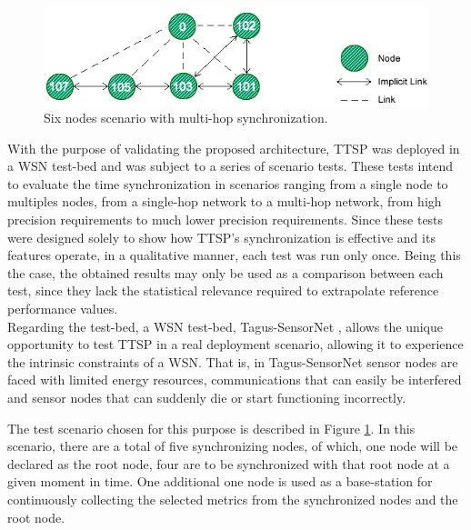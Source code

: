 \documentclass[11pt,a4]{article}
\begin{document}
\begin{multicols}{2}
\begin{figure}[!b]
\begin{center}
\includegraphics[scale=0.4]{./images/19-ttsp-test_topology.png}
\end{center}
\caption{Six nodes scenario with multi-hop synchronization.}
\label{scenario6}
\end{figure}

With the purpose of validating the proposed architecture, TTSP was deployed in a WSN test-bed and was subject to a series of scenario tests. These tests intend to evaluate the time synchronization in scenarios ranging from a single node to multiples nodes, from a single-hop network to a multi-hop network, from high precision requirements to much lower precision requirements. Since these tests were designed solely to show how TTSP's synchronization is effective and its features operate, in a qualitative manner, each test was run only once. Being this the case, the obtained results may only be used as a comparison between each test, since they lack the statistical relevance required to extrapolate reference performance values.\\
Regarding the test-bed, a WSN test-bed, Tagus-SensorNet \cite{pedrosa08}, allows the unique opportunity to test TTSP in a real deployment scenario, allowing it to experience the intrinsic constraints of a WSN. That is, in Tagus-SensorNet sensor nodes are faced with limited energy resources, communications that can easily be interfered and sensor nodes that can suddenly die or start functioning incorrectly.

The test scenario chosen for this purpose is described in Figure \ref{scenario6}. In this scenario, there are a total of five synchronizing nodes, of which, one node will be declared as the root node, four are to be synchronized with that root node at a given moment in time. One additional one node is used as a base-station for continuously collecting the selected metrics from the synchronized nodes and the root node. 


\end{multicols}
\end{document}
